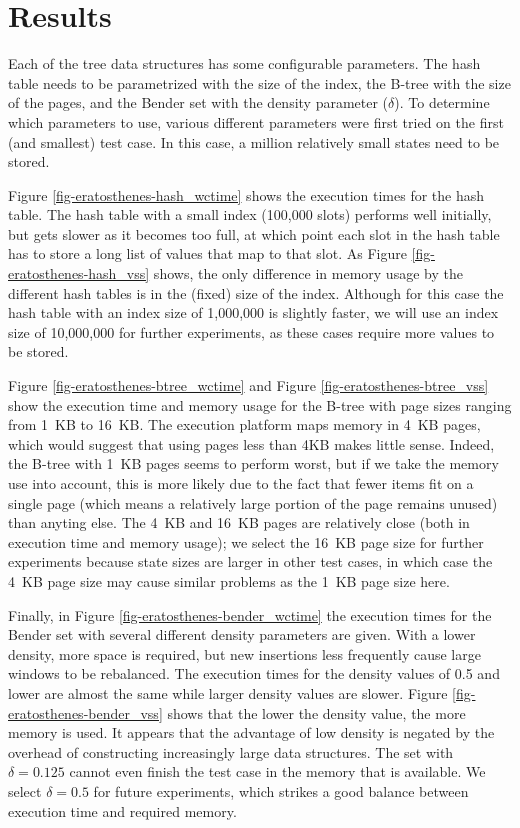 \documentclass{acm_proc_article-sp}
\begin{document}

\section{Results}
Each of the tree data structures has some configurable parameters. The hash table
needs to be parametrized with the size of the index, the B-tree with the size of
the pages, and the Bender set with the density parameter ($\delta$). To determine
which parameters to use, various different parameters were first tried on the
first (and smallest) test case. In this case, a million relatively small states
need to be stored.

Figure \ref{fig-eratosthenes-hash_wctime} shows the execution times for the hash
table.
The hash table
with a small index (100,000 slots) performs well initially, but gets slower as
it becomes too full, at which point each slot in the hash table has to store a
long list of values that map to that slot.
As Figure \ref{fig-eratosthenes-hash_vss} shows, the only difference in memory
usage by the different hash tables is in the (fixed) size of the index.
Although for this case the hash table with an index size of 1,000,000 is
slightly faster, we will use an index size of 10,000,000 for further
experiments, as these cases require more values to be stored.

Figure \ref{fig-eratosthenes-btree_wctime} and Figure
\ref{fig-eratosthenes-btree_vss} show the execution time and memory usage
for the B-tree with page sizes ranging from 1~KB to 16~KB. The execution platform
maps memory in 4~KB pages, which would suggest that using pages less than 4KB
makes little sense. Indeed, the B-tree with 1~KB pages seems to perform worst,
but if we take the memory use into account, this is more likely due to the fact
that fewer items fit on a single page (which means a relatively large portion of
the page remains unused) than anyting else.
The 4~KB and 16~KB pages are relatively close (both in execution time and memory
usage); we select the 16~KB page size for further experiments because state sizes
are larger in other test cases, in which case the 4~KB page size may cause similar
problems as the 1~KB page size here.

Finally, in Figure \ref{fig-eratosthenes-bender_wctime} the execution times for
the Bender set with several different density parameters are given. With a lower
density, more space is required, but new insertions less frequently cause large windows to be rebalanced.
The execution times for the density values of 0.5 and lower are almost the same
while larger density values are slower.
Figure \ref{fig-eratosthenes-bender_vss} shows that the lower the density value,
the more memory is used. It appears that the advantage of low density is
negated by the overhead of constructing increasingly large data structures.
The set with $\delta=0.125$ cannot even finish the test case in the memory
that is available. We select $\delta=0.5$ for future experiments, which strikes
a good balance between execution time and required memory.
\end{document}
